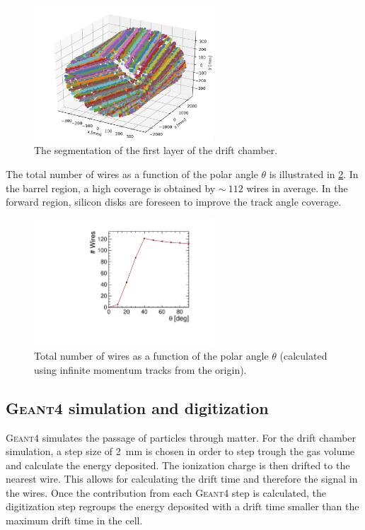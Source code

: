 \begin{figure}[ht]
	\centering
	\includegraphics[width=0.6\textwidth]{figures/allHits}
	\caption{The segmentation of the first layer of the drift chamber.}
	\label{fig_segmentation_first_case}
\end{figure}

The total number of wires as a function of the polar angle $\theta$ is illustrated in \cref{fig_segmentation_second_case}. In the barrel region, a high coverage is obtained by $\sim~112$ wires in average. In the forward region, silicon disks are foreseen to improve the track angle coverage.

\begin{figure}[ht]
	\centering
	\includegraphics[width=0.6\textwidth]{figures/numWires}%
	\caption{Total number of wires as a function of the polar angle $\theta$ (calculated using infinite momentum tracks from the origin).}
	\label{fig_segmentation_second_case}
\end{figure}


\subsection{\textsc{Geant4} simulation and digitization}
\textsc{Geant4} simulates the passage of particles through matter. For the drift chamber simulation, a step size of 2~mm is chosen in order to step trough the gas volume and calculate the energy deposited. The ionization charge is then drifted to the nearest wire. This allows for calculating the drift time and therefore the signal in the wires. Once the contribution from each \textsc{Geant4} step is calculated, the digitization step regroups the energy deposited with a drift time smaller than the maximum drift time in the cell.

